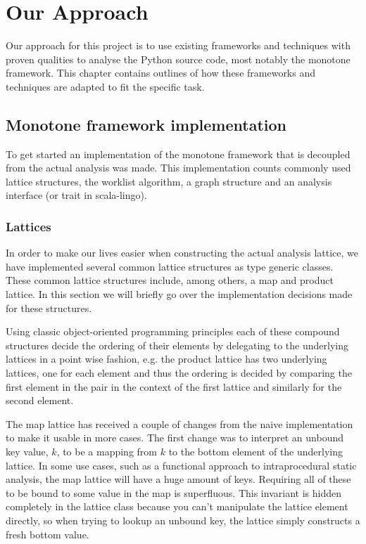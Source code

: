\chapter{Our Approach}

Our approach for this project is to use existing frameworks and techniques with proven qualities to analyse the Python source code, most notably the monotone framework. This chapter contains outlines of how these frameworks and techniques are adapted to fit the specific task.

\section{Monotone framework implementation}

To get started an implementation of the monotone framework that is decoupled from the actual analysis was made. This implementation counts commonly used lattice structures, the worklist algorithm, a graph structure and an analysis interface (or trait in scala-lingo).

\subsection{Lattices}

In order to make our lives easier when constructing the actual analysis lattice, we have implemented several common lattice structures as type generic classes. These common lattice structures include, among others, a map and product lattice. In this section we will briefly go over the implementation decisions made for these structures.

Using classic object-oriented programming principles each of these compound structures decide the ordering of their elements by delegating to the underlying lattices in a point wise fashion, e.g. the product lattice has two underlying lattices, one for each element and thus the ordering is decided by comparing the first element in the pair in the context of the first lattice and similarly for the second element.

The map lattice has received a couple of changes from the naive implementation to make it usable in more cases. The first change was to interpret an unbound key value, $k$, to be a mapping from $k$ to the bottom element of the underlying lattice. In some use cases, such as a functional approach to intraprocedural static analysis, the map lattice will have a huge amount of keys. Requiring all of these to be bound to some value in the map is superfluous. This invariant is hidden completely in the lattice class because you can't manipulate the lattice element directly, so when trying to lookup an unbound key, the lattice simply constructs a fresh bottom value.

